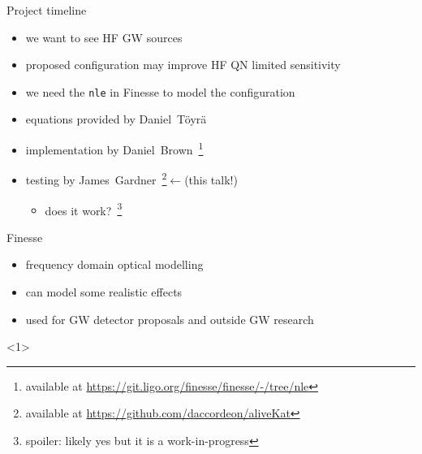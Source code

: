 \documentclass[12pt]{beamer}
\newcommand{\code}[1]{\texttt{#1}}
\begin{document}
\begin{frame}{Project timeline}
\begin{itemize}
\item we want to see HF GW sources
\item proposed configuration may improve HF QN limited sensitivity
\item we need the \code{nle} in Finesse to model the configuration
\item equations provided by Daniel~Töyrä
\item implementation by Daniel~Brown\!~\footnote{available at {\color{blue}\url{https://git.ligo.org/finesse/finesse/-/tree/nle}}}
\item testing by James~Gardner\!~\footnote{available at {\color{blue}\url{https://github.com/daccordeon/aliveKat}}}$\longleftarrow$(this talk!)
    \begin{itemize}
    \item does it work?\!~\footnote{spoiler: likely yes but it is a work-in-progress}
    \end{itemize}
\end{itemize}
\end{frame}

\begin{frame}{Finesse}
\begin{itemize}
\item<1> frequency domain optical modelling 
\item<1> can model some realistic effects
\item<1> used for GW detector proposals and outside GW research
\end{itemize}
\begin{figure}
    \captionsetup[subfigure]{labelformat=empty}
    \centering 
    \qquad
\end{figure}
<1>
\end{frame}
\end{document}
